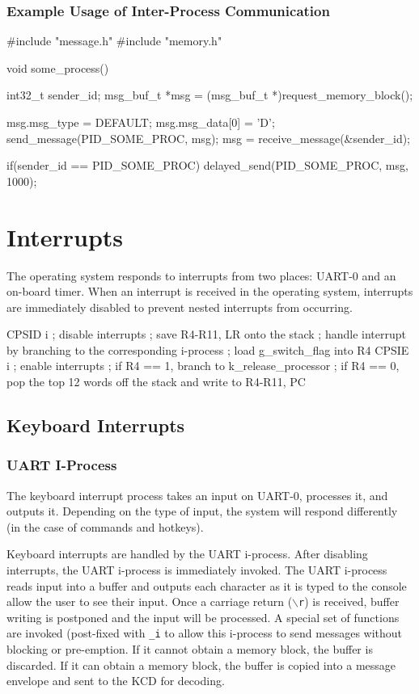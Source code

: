 \documentclass[se]{uw-wkrpt}
\begin{document}
\subsubsection{Example Usage of Inter-Process Communication}

\begin{code}
#include "message.h"
#include "memory.h"

void some_process() {
	int32_t sender_id;
	msg_buf_t *msg = (msg_buf_t *)request_memory_block();
	
	msg.msg_type = DEFAULT;
	msg.msg_data[0] = 'D';
	send_message(PID_SOME_PROC, msg);
	msg = receive_message(&sender_id);
	
	if(sender_id == PID_SOME_PROC) {
		delayed_send(PID_SOME_PROC, msg, 1000);
	}
}
\end{code}

\section{Interrupts}\label{sec:interupt}

The operating system responds to interrupts from two places: UART-0 and an on-board timer. When an interrupt is received in the operating system, interrupts are immediately disabled to prevent nested interrupts from occurring.

\begin{code}
CPSID i ; disable interrupts
; save R4-R11, LR onto the stack
; handle interrupt by branching to the corresponding i-process
; load g_switch_flag into R4
CPSIE i ; enable interrupts
; if R4 == 1, branch to k_release_processor
; if R4 == 0, pop the top 12 words off the stack and write to R4-R11, PC
\end{code}

\subsection{Keyboard Interrupts} \label{sec:uart}

\subsubsection{UART I-Process}

The keyboard interrupt process takes an input on UART-0, processes it, and outputs it. Depending on the type of input, the system will respond differently (in the case of commands and hotkeys).

Keyboard interrupts are handled by the UART i-process. After disabling interrupts, the UART i-process is immediately invoked. The UART i-process reads input into a buffer and outputs each character as it is typed to the console allow the user to see their input. Once a carriage return (\texttt{$\backslash$r}) is received, buffer writing is postponed and the input will be processed. A special set of functions are invoked (post-fixed with \texttt{\_i} to allow this i-process to send messages without blocking or pre-emption. If it cannot obtain a memory block, the buffer is discarded. If it can obtain a memory block, the buffer is copied into a message envelope and sent to the KCD for decoding. 
\end{document}
